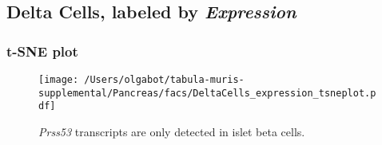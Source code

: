 \clearpage

\subsection{Delta Cells, labeled by \emph{Expression}}

\clearpage
\subsubsection{t-SNE plot}
\begin{figure}[h]
\centering
\texttt{[image: /Users/olgabot/tabula-muris-supplemental/Pancreas/facs/DeltaCells\_expression\_tsneplot.pdf]}

\caption{\emph{Prss53} transcripts are only detected in islet beta cells.
}
\end{figure}

